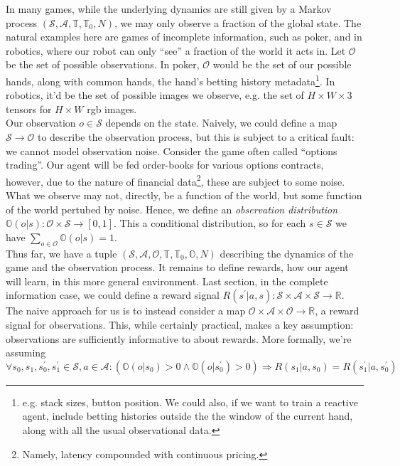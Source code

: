 \documentclass[12pt]{article}
\begin{document}
In many games, while the underlying dynamics are still given by a Markov process $(\mathcal{S}, \mathcal{A}, \mathbb{T}, \mathbb{T}_0, N)$,
we may only observe a fraction of the global state.  The natural examples here are games of incomplete information, such as 
poker, and in robotics, where our robot can only ``see'' a fraction of the world it acts in. Let $\mathcal{O}$ be the set of 
possible observations. In poker, $\mathcal{O}$ would be the set of our possible hands, along with common hands, the hand's 
betting history metadata\footnote{
    e.g. stack sizes, button position. We could also, if we want to train a reactive agent, include betting histories outside 
    the the window of the current hand, along with all the usual observational data. 
}. In robotics, it'd be the set of possible images we observe, e.g. the set of $H \times W \times 3$ tensors for $H \times W$ rgb 
images. \\

Our observation $o \in \mathcal{S}$ depends on the state. Naively, we could define a map $\mathcal{S} \to \mathcal{O}$ to describe 
the observation process, but this is subject to a critical fault: we cannot model observation noise. Consider the game often 
called ``options trading''. Our agent will be fed order-books for various options contracts, however, due to the nature of financial 
data\footnote{
    Namely, latency compounded with continuous pricing.
}, these are subject to some noise. What we observe may not, directly, be a function of the world, but some function of the world 
pertubed by noise. Hence, we define an \textit{observation distribution} $\mathbb{O}(o |s): \mathcal{O} \times \mathcal{S} \to 
[0,1]$. This a conditional distribution, so for each $s \in \mathcal{S}$ we have $\sum_{o \in \mathcal{O}}\mathbb{O}(o | s) = 1$. \\

Thus far, we have a tuple $(\mathcal{S}, \mathcal{A}, \mathcal{O}, \mathbb{T}, \mathbb{T}_0, \mathbb{O}, N)$ describing the 
dynamics of the game and the observation process. It remains to define rewards, how our agent will learn, in this more general
environment. Last section, in the complete information case, we could define a reward signal $R(s^\prime | a, s): \mathcal{S} 
\times \mathcal{A} \times \mathcal{S} \to \mathbb{R}$. The naive approach for us is to instead consider a map $\mathcal{O} \times 
\mathcal{A} \times \mathcal{O} \to \mathbb{R}$, a reward signal for observations. This, while certainly practical, makes a key 
assumption: observations are sufficiently informative to about rewards. More formally, we're assuming 
$$
\forall s_0, s_1, s^\prime_0, s^\prime_1 \in \mathcal{S}, a \in \mathcal{A}: (\mathbb{O}(o | s_0) > 0 \land 
\mathbb{O}(o | s^\prime_0) > 0) \Longrightarrow R(s_1 | a, s_0) = R(s_1^\prime | a, s^\prime_0)
$$
\end{document}
